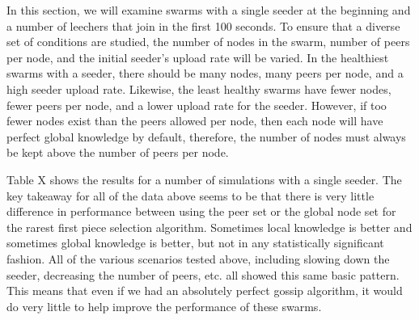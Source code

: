 In this section, we will examine swarms with a single seeder at the beginning
and a number of leechers that join in the first 100 seconds. To ensure
that a diverse set of conditions are studied, the number of nodes in the swarm, 
number of peers per node, and the initial seeder's upload rate will be varied.
In the healthiest swarms with a seeder, there should be many nodes, many peers per node, and
a high seeder upload rate. Likewise, the least healthy swarms have fewer nodes,
fewer peers per node, and a lower upload rate for the seeder. However, if too fewer
nodes exist than the peers allowed per node, then each node will have perfect global
knowledge by default, therefore, the number of nodes must always be kept above
the number of peers per node. 







Table X shows the results for a number of simulations with a single
seeder. The key takeaway for all of the data above seems to be that there
is very little difference in performance between using the peer set or the
global node set for the rarest first piece selection algorithm. Sometimes
local knowledge is better and sometimes global knowledge is better,
but not in any statistically significant fashion. All of the various
scenarios tested above, including slowing down the seeder, decreasing
the number of peers, etc. all showed this same basic pattern. This means
that even if we had an absolutely perfect gossip algorithm, it would do
very little to help improve the performance of these swarms.

